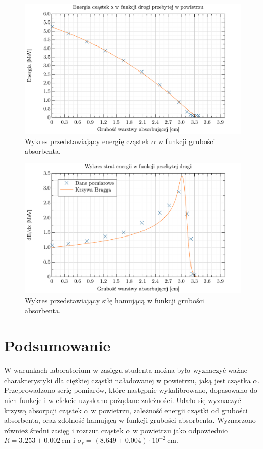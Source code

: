 \documentclass[pra,
superscriptaddress,
amssymb,amsmath,amsmath,showpacs,reprint,twocolumn]{revtex4-1}
\begin{document}
\begin{figure}[h!]
    \centering
    \includegraphics[keepaspectratio, width=0.8\linewidth]{energia_vs_absorber.pdf}
    \caption{Wykres przedstawiający energię cząstek $\alpha$ w funkcji grubości absorbenta.}
    \label{fig:energia_absorber}
\end{figure}

\begin{figure}[h!]
    \centering
    \includegraphics[keepaspectratio, width=0.8\linewidth]{bardziejkrzywaBragga.pdf}
    \caption{Wykres przedstawiający siłę hamującą w funkcji grubości absorbenta.}
    \label{fig:stopping_power}
\end{figure}

\FloatBarrier
\section{Podsumowanie}

W warunkach laboratorium w zasięgu studenta można było wyznaczyć ważne charakterystyki dla ciężkiej cząstki naładowanej w powietrzu, jaką jest cząstka $\alpha$. Przeprowadzono serię pomiarów, które następnie wykalibrowano, dopasowano do nich funkcje i w efekcie uzyskano pożądane zależności. Udało się wyznaczyć krzywą absorpcji cząstek $\alpha$ w powietrzu, zależność energii cząstki od grubości absorbenta, oraz zdolność hamującą w funkcji grubości absorbenta. Wyznaczono również średni zasięg i rozrzut cząstek $\alpha$ w powietrzu jako odpowiednio $\bar{R} = 3.253 \pm 0.002$\,cm i $\sigma_r = (8.649 \pm 0.004)\cdot 10^{-2}$\,cm.
  
\end{document}
